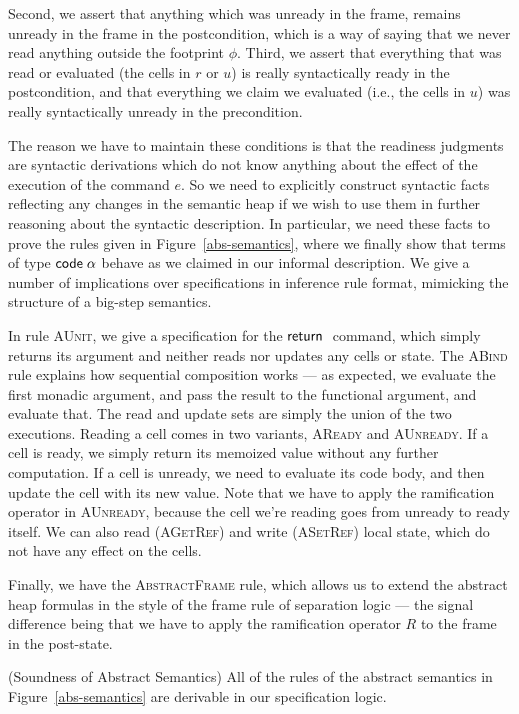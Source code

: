 \documentclass[preprint,natbib]{sigplanconf}
\begin{document}
Second, we assert that anything which was unready in the frame,
remains unready in the frame in the postcondition, which is a way of
saying that we never read anything outside the footprint $\phi$.
Third, we assert that everything that was read or evaluated (the cells
in $r$ or $u$) is really syntactically ready in the postcondition, and
that everything we claim we evaluated (i.e., the cells in $u$) was
really syntactically unready in the precondition.

The reason we have to maintain these conditions is that the readiness
judgments are syntactic derivations which do not know anything about
the effect of the execution of the command $e$. So we need to
explicitly construct syntactic facts reflecting any changes in the
semantic heap if we wish to use them in further reasoning about the
syntactic description. In particular, we need these facts to prove the
rules given in Figure~\ref{abs-semantics}, where we finally show that
terms of type $\mbox{\textsf{{code}}}\;{\alpha}$ behave as we claimed in our informal
description. We give a number of implications over specifications in
inference rule format, mimicking the structure of a big-step
semantics.

In rule \textsc{AUnit}, we give a specification for the $\mbox{\textsf{{return}}}\;$
command, which simply returns its argument and neither reads nor
updates any cells or state. The \textsc{ABind} rule explains how
sequential composition works --- as expected, we evaluate the first
monadic argument, and pass the result to the functional argument, and
evaluate that. The read and update sets are simply the union of the
two executions. Reading a cell comes in two variants, \textsc{AReady}
and \textsc{AUnready}. If a cell is ready, we simply return its
memoized value without any further computation. If a cell is unready,
we need to evaluate its code body, and then update the cell with its
new value. Note that we have to apply the ramification operator in
\textsc{AUnready}, because the cell we're reading goes from unready to
ready itself. We can also read (\textsc{AGetRef}) and write
(\textsc{ASetRef}) local state, which do not have any effect on the
cells.

Finally, we have the \textsc{AbstractFrame} rule, which allows us to
extend the abstract heap formulas in the style of the frame rule of 
separation logic --- the signal difference being that we have to apply 
the ramification operator $R$ to the frame in the post-state. 

\begin{prop}{(Soundness of Abstract Semantics)}
All of the rules of the abstract semantics in Figure~\ref{abs-semantics} are
derivable in our specification logic. 
\end{prop}
\end{document}
